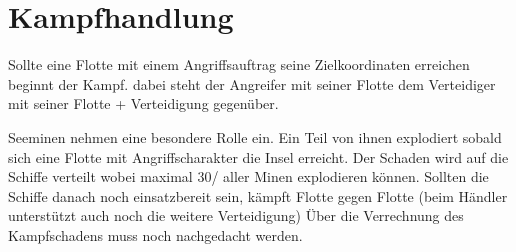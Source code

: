 \documentclass[10pt,a4paper]{article}
\begin{document}
\section{Kampfhandlung}

Sollte eine Flotte mit einem Angriffsauftrag seine Zielkoordinaten erreichen beginnt der Kampf. 
dabei steht der Angreifer mit seiner Flotte dem Verteidiger mit seiner Flotte + Verteidigung gegenüber. 

Seeminen nehmen eine besondere Rolle ein. Ein Teil von ihnen explodiert sobald sich eine Flotte mit Angriffscharakter die Insel erreicht. Der Schaden wird auf die Schiffe verteilt wobei maximal 30/%
aller Minen explodieren können. Sollten die Schiffe danach noch einsatzbereit sein, kämpft Flotte gegen Flotte (beim Händler unterstützt auch noch die weitere Verteidigung)
Über die Verrechnung des Kampfschadens muss noch nachgedacht werden. 
\end{document}
